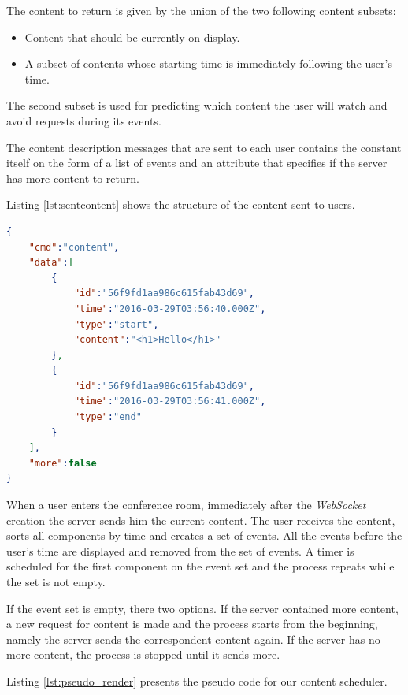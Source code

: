 	The content to return is given by the union of the two following content subsets:
	\begin{itemize}
		\item Content that should be currently on display.
		\item A subset of contents whose starting time is immediately following the user's time.
	\end{itemize}

	The second subset is used for predicting which content the user will watch and avoid requests during its events.

	The content description messages that are sent to each user contains the constant itself on the form of a list of events and an attribute that specifies if the server has more content to return.

	Listing \ref{lst:sentcontent} shows the structure of the content sent to users.

\begin{minipage}{\linewidth}
\begin{lstlisting}[caption={Exampe of content sent to users},label={lst:sentcontent},language=json]
{
	"cmd":"content",
	"data":[
		{
			"id":"56f9fd1aa986c615fab43d69",
			"time":"2016-03-29T03:56:40.000Z",
			"type":"start",
			"content":"<h1>Hello</h1>"
		},
		{
			"id":"56f9fd1aa986c615fab43d69",
			"time":"2016-03-29T03:56:41.000Z",
			"type":"end"
		}
	],
	"more":false
}
\end{lstlisting}
\end{minipage}

	When a user enters the conference room, immediately after the \emph{WebSocket} creation the server sends him the current content. The user receives the content, sorts all components by time and creates a set of events. All the events before the user's time are displayed and removed from the set of events. A timer is scheduled for the first component on the event set and the process repeats while the set is not empty.

	If the event set is empty, there two options. If the server contained more content, a new request for content is made and the process starts from the beginning, namely the server sends the correspondent content again. If the server has no more content, the process is stopped until it sends more.

	Listing \ref{lst:pseudo_render} presents the pseudo code for our content scheduler.

